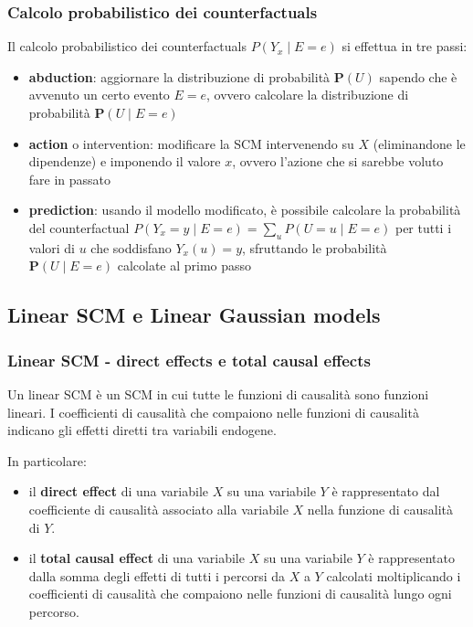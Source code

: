 \subsubsection*{Calcolo probabilistico dei counterfactuals}
Il calcolo probabilistico dei counterfactuals \(P(Y_x \mid E = e)\) si effettua in tre passi:
\begin{itemize}
	\item \textbf{abduction}: aggiornare la distribuzione di probabilità \(\textbf{P}(U)\) sapendo che è avvenuto un certo
	evento \(E = e\), ovvero calcolare la distribuzione di probabilità \(\textbf{P}(U \mid E = e)\)
	\item \textbf{action} o intervention: modificare la SCM intervenendo su \(X\) (eliminandone le dipendenze) e imponendo
	il valore \(x\), ovvero l'azione che si sarebbe voluto fare in passato
	\item \textbf{prediction}: usando il modello modificato, è possibile calcolare la probabilità del counterfactual
	\(P(Y_x = y \mid E = e) = \sum_{u} P(U = u \mid E = e)\) per tutti i valori di \(u\) che soddisfano \(Y_x(u) = y\),
	sfruttando le probabilità \(\textbf{P}(U \mid E = e)\) calcolate al primo passo
\end{itemize}

\subsection{Linear SCM e Linear Gaussian models}
\subsubsection*{Linear SCM - direct effects e total causal effects}
Un linear SCM è un SCM in cui tutte le funzioni di causalità sono funzioni lineari. I coefficienti di causalità che compaiono
nelle funzioni di causalità indicano gli effetti diretti tra variabili endogene.

In particolare:
\begin{itemize}
	\item il \textbf{direct effect} di una variabile \(X\) su una variabile \(Y\) è rappresentato dal coefficiente di
	causalità associato alla variabile \(X\) nella funzione di causalità di \(Y\).
	\item il \textbf{total causal effect} di una variabile \(X\) su una variabile \(Y\) è rappresentato dalla somma degli effetti di tutti
	i percorsi da \(X\) a \(Y\) calcolati moltiplicando i coefficienti di causalità che compaiono nelle funzioni di causalità
	lungo ogni percorso.
\end{itemize}

